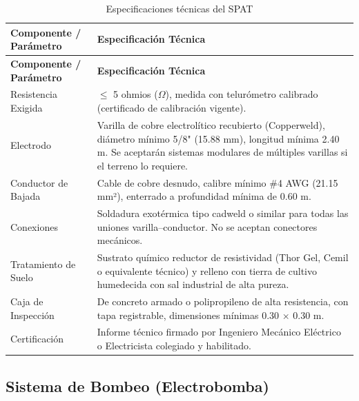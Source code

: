 \documentclass[12pt,a4paper]{article}
\begin{document}
\begin{longtable}{L{4.5cm}p{10.5cm}}
  \caption{Especificaciones técnicas del SPAT}
  \label{tab:spat}\\
  \toprule
  \textbf{Componente / Parámetro} & \textbf{Especificación Técnica} \\
  \midrule
  \endfirsthead
  \toprule
  \textbf{Componente / Parámetro} & \textbf{Especificación Técnica} \\
  \midrule
  \endhead
  Resistencia Exigida & $\leq$ 5 ohmios ($\Omega$), medida con telurómetro calibrado (certificado de calibración vigente). \\
  Electrodo & Varilla de cobre electrolítico recubierto (Copperweld), diámetro mínimo 5/8" (15.88 mm), longitud mínima 2.40 m. Se aceptarán sistemas modulares de múltiples varillas si el terreno lo requiere. \\
  Conductor de Bajada & Cable de cobre desnudo, calibre mínimo \#4 AWG (21.15 mm²), enterrado a profundidad mínima de 0.60 m. \\
  Conexiones & Soldadura exotérmica tipo cadweld o similar para todas las uniones varilla--conductor. No se aceptan conectores mecánicos. \\
  Tratamiento de Suelo & Sustrato químico reductor de resistividad (Thor Gel, Cemil o equivalente técnico) y relleno con tierra de cultivo humedecida con sal industrial de alta pureza. \\
  Caja de Inspección & De concreto armado o polipropileno de alta resistencia, con tapa registrable, dimensiones mínimas 0.30 $\times$ 0.30 m. \\
  Certificación & Informe técnico firmado por Ingeniero Mecánico Eléctrico o Electricista colegiado y habilitado. \\
  \bottomrule
\end{longtable}

\subsection{Sistema de Bombeo (Electrobomba)}
\end{document}
